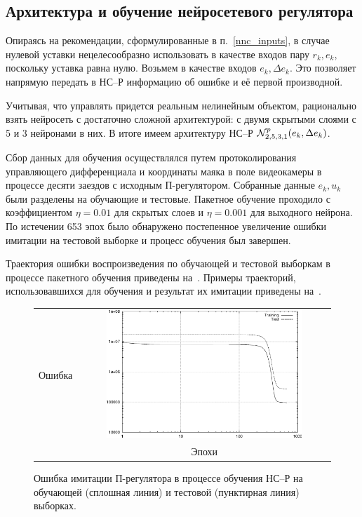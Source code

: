 \subsection{Архитектура и обучение нейросетевого регулятора}

Опираясь на рекомендации, сформулированные в п.~\ref{nnc_inputs}, в
случае нулевой уставки нецелесообразно использовать в качестве входов
пару $r_k,e_k$, поскольку уставка равна нулю.  Возьмем в качестве
входов $e_k,\Delta e_k$.  Это позволяет напрямую передать в НС--Р
информацию об ошибке и её первой производной.

Учитывая, что управлять придется реальным нелинейным объектом,
рационально взять нейросеть с достаточно сложной архитектурой: с двумя
скрытыми слоями с 5 и 3 нейронами в них.  В итоге имеем архитектуру
НС--Р $\mathcal{N}^p_{2,5,3,1}(e_k,\Delta e_k)$.

Сбор данных для обучения осуществлялся путем протоколирования
управляющего дифференциала и координаты маяка в поле видеокамеры в
процессе десяти заездов с исходным П-регулятором.  Собранные данные
${e_k,u_k}$ были разделены на обучающие и тестовые.  Пакетное обучение
проходило с коэффициентом $\eta=0.01$ для скрытых слоев и $\eta=0.001$
для выходного нейрона.  По истечении 653 эпох было обнаружено
постепенное увеличение ошибки имитации на тестовой выборке и процесс
обучения был завершен.

Траектория ошибки воспроизведения по обучающей и тестовой выборкам в
процессе пакетного обучения приведены
на~.  Примеры траекторий,
использовавшихся для обучения и результат их имитации приведены
на~.

\begin{figure}
\centering
  \begin{tabular}{rc}
    \begin{sideways}
      {\hspace{4cm}\small Ошибка}
    \end{sideways}
    &
    \includegraphics[width=0.8\textwidth,%
                     totalheight=0.35\textheight]{moby_nnc_pretr_training}\\
    & {\small Эпохи} \\
\end{tabular}
\caption{Ошибка имитации П-регулятора в процессе обучения НС--Р на
обучающей (сплошная линия) и тестовой (пунктирная линия) выборках.}
\label{fig:moby_nnc_pretr_training}
\end{figure}

